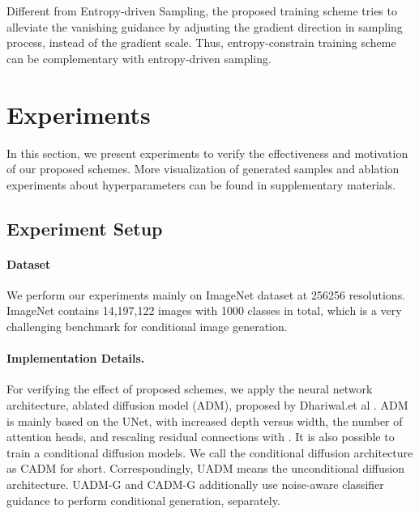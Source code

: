 \documentclass[runningheads]{llncs}
\begin{document}
Different from Entropy-driven Sampling, the proposed training scheme tries to alleviate the vanishing guidance by adjusting the gradient direction in sampling process, instead of the gradient scale.
Thus, entropy-constrain training scheme can be complementary with entropy-driven sampling.












 

\section{Experiments}
In this section, we present experiments to verify the effectiveness and motivation of our proposed schemes. More visualization of generated samples and ablation experiments about hyperparameters can be found in supplementary materials.


\subsection{Experiment Setup}
\paragraph{\textbf{Dataset}}
We perform our experiments mainly on ImageNet dataset \cite{imagenet} at 256256 resolutions.
ImageNet contains 14,197,122 images with 1000 classes in total, which is a very challenging benchmark for conditional image generation.


\vspace{-2pt}
\paragraph{\textbf{Implementation Details.}}
For verifying the effect of proposed schemes, we apply the neural network architecture, ablated diffusion model (ADM), proposed by Dhariwal.et al \cite{dhariwal2021diffusion}. 
ADM is mainly based on the UNet, with increased depth versus width, the number of attention heads, and rescaling residual connections with .
It is also possible to train a conditional diffusion models. We call the conditional diffusion architecture \cite{dhariwal2021diffusion} as CADM for short.
Correspondingly, UADM means the unconditional diffusion architecture.
UADM-G and CADM-G additionally use noise-aware classifier guidance to perform conditional generation, separately.
\end{document}
